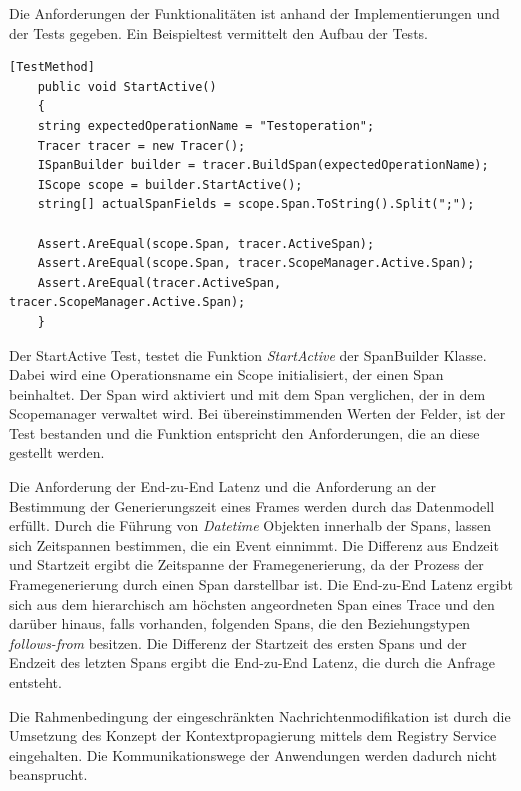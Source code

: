 Die Anforderungen der Funktionalitäten ist anhand der Implementierungen und der Tests gegeben. Ein Beispieltest vermittelt den Aufbau der Tests.

\begin{minipage}[]{\textwidth}
	\begin{lstlisting}[frame=trBL]
	[TestMethod]
	public void StartActive()
	{
	string expectedOperationName = "Testoperation";
	Tracer tracer = new Tracer();
	ISpanBuilder builder = tracer.BuildSpan(expectedOperationName);
	IScope scope = builder.StartActive();
	string[] actualSpanFields = scope.Span.ToString().Split(";");
	
	Assert.AreEqual(scope.Span, tracer.ActiveSpan);
	Assert.AreEqual(scope.Span, tracer.ScopeManager.Active.Span);
	Assert.AreEqual(tracer.ActiveSpan, tracer.ScopeManager.Active.Span);
	}
	\end{lstlisting}
	\label{listing:Unit-Test der Spanbuilder Klasse}
\end{minipage}

Der StartActive Test, testet die Funktion \emph{StartActive} der SpanBuilder Klasse. Dabei wird eine Operationsname ein Scope initialisiert, der einen Span beinhaltet. Der Span wird aktiviert und mit dem Span verglichen, der in dem Scopemanager verwaltet wird. Bei übereinstimmenden Werten der Felder, ist der Test bestanden und die Funktion entspricht den Anforderungen, die an diese gestellt werden.

Die Anforderung der End-zu-End Latenz und die Anforderung an der Bestimmung der Generierungszeit eines Frames werden durch das Datenmodell erfüllt. Durch die Führung von \emph{Datetime} Objekten innerhalb der Spans, lassen sich Zeitspannen bestimmen, die ein Event einnimmt. Die Differenz aus Endzeit und Startzeit ergibt die Zeitspanne der Framegenerierung, da der Prozess der Framegenerierung durch einen Span darstellbar ist. Die End-zu-End Latenz ergibt sich aus dem hierarchisch am höchsten angeordneten Span eines Trace und den darüber hinaus, falls vorhanden, folgenden Spans, die den Beziehungstypen \emph{follows-from} besitzen. Die Differenz der Startzeit des ersten Spans und der Endzeit des letzten Spans ergibt die End-zu-End Latenz, die durch die Anfrage entsteht.

Die Rahmenbedingung der eingeschränkten Nachrichtenmodifikation ist durch die Umsetzung des Konzept der Kontextpropagierung mittels dem Registry Service eingehalten. Die Kommunikationswege der Anwendungen werden dadurch nicht beansprucht.


